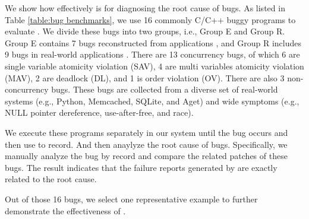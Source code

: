 We show how effectively \TheName is for diagnosing the root cause of bugs. As
listed in Table \ref{table:bug benchmarks}, we use 16 commonly C/C++ buggy
programs
\cite{cui2018rept,kasikci_lazy_2017,yu2009case,yu2012maple,kasikci2015failure, liang2020ript}
to evaluate \TheName.
We divide these bugs into two groups, i.e., Group E and Group R.
Group E contains 7 bugs reconstructed from
applications \cite{yu2009case,yu2012maple}, and Group R includes 9 bugs in
real-world applications
\cite{cui2018rept,kasikci_lazy_2017, kasikci2015failure, liang2020ript}.
There are 13 concurrency bugs, of which 6 are single variable atomicity
violation (SAV), 4 are multi variables atomicity violation (MAV), 2 are deadlock
(DL), and 1 is order violation (OV). There are also 3 non-concurrency bugs.
These bugs are collected from a diverse set of real-world systems (e.g., Python,
Memcached, SQLite, and Aget) and wide symptoms (e.g., NULL pointer dereference,
use-after-free, and race).




We execute these programs separately in our system until the bug occurs
and then use \TheName to record. And then anaylyze the root cause of bugs.
 Specifically, we manually analyze the bug by record and compare the related patches 
of these bugs. The result indicates that the failure reports
generated by \TheName are exactly related to the root cause.

Out of those 16 bugs, we select one representative
example to further demonstrate the effectiveness of \TheName.



